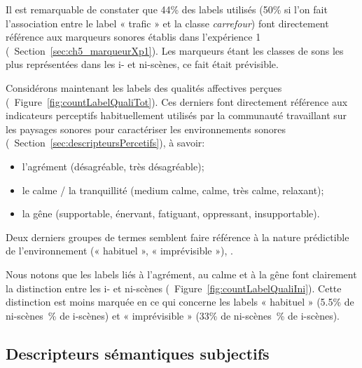  
Il est remarquable de constater que 44\% des labels utilisés (50\% si l'on fait l'association entre le label « trafic » et la classe \emph{carrefour}) font directement référence aux marqueurs sonores établis dans l'expérience 1 (\cf~Section~\ref{sec:ch5_marqueurXp1}). Les marqueurs étant les classes de sons les plus représentées dans les i- et ni-scènes, ce fait était prévisible.

Considérons maintenant les labels des qualités affectives perçues (\cf~Figure~\ref{fig:countLabelQualiTot}). Ces derniers font directement référence aux indicateurs perceptifs habituellement utilisés par la communauté travaillant sur les paysages sonores pour caractériser les environnements sonores (\cf~Section~\ref{sec:descripteursPercetifs}), à savoir:

\begin{itemize}
\item l'agrément (désagréable, très désagréable);
\item le calme / la tranquillité (medium calme, calme, très calme, relaxant);
\item la gêne (supportable, énervant, fatiguant, oppressant, insupportable).
\end{itemize}

Deux derniers groupes de termes semblent faire référence à la nature prédictible de l'environnement (« habituel », « imprévisible »),  . 

Nous notons que les labels liés à l'agrément, au calme et à la gêne font clairement la distinction entre les i- et ni-scènes (\cf~Figure~\ref{fig:countLabelQualiIni}). Cette distinction est moins marquée en ce qui concerne les labels « habituel » (5.5\% de ni-scènes~\% de i-scènes) et « imprévisible » (33\% de ni-scènes~\% de i-scènes).

\subsection{Descripteurs sémantiques subjectifs}

